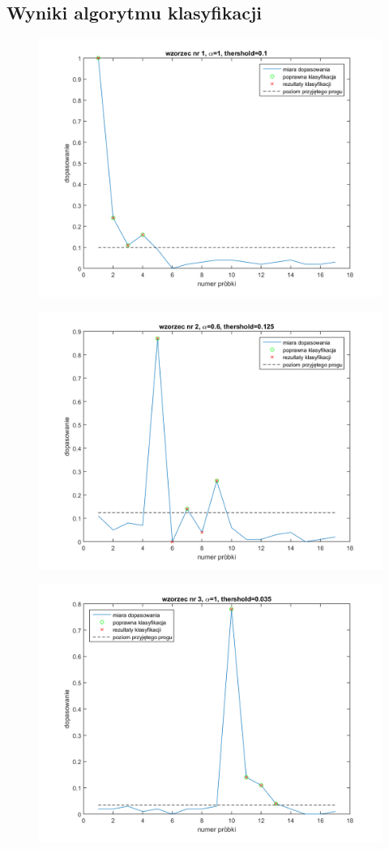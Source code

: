 \documentclass[a4paper, 12pt, titlepage]{article}
\begin{document}
        \subsection{Wyniki algorytmu klasyfikacji}
            \begin{figure}[H]
                \centering
                \includegraphics[width=0.8\linewidth]{second_rozpoznane/metric_1.png}
            \end{figure}
            \begin{figure}[H]
                \centering
                \includegraphics[width=0.8\linewidth]{second_rozpoznane/metric_2.png}
            \end{figure}
            \begin{figure}[H]
                \centering
                \includegraphics[width=0.8\linewidth]{second_rozpoznane/metric_3.png}
            \end{figure}
\end{document}
